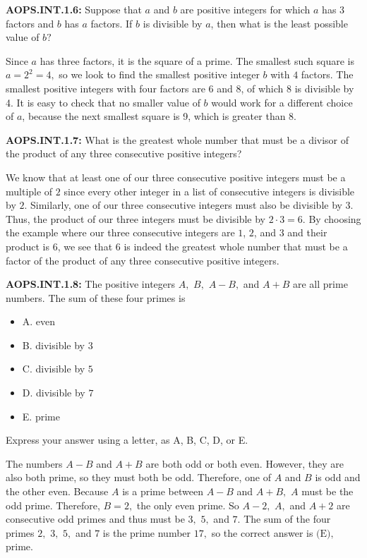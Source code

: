 \documentclass[11pt]{article}
\newenvironment{uzdevums}[1][\unskip]{%
\vspace{3mm}
\noindent
\textbf{#1:}
\noindent}
{}
\begin{document}
\begin{uzdevums}[AOPS.INT.1.6]
Suppose that $a$ and $b$ are positive integers for which $a$ has $3$ factors and $b$ has $a$ factors. If $b$ is divisible by $a$, then what is the least possible value of $b?$
\end{uzdevums}

Since $a$ has three factors, it is the square of a prime. The smallest such square is $a=2^2=4,$ so we look to find the smallest positive integer $b$ with $4$ factors. The smallest positive integers with four factors are 6 and 8, of which $\boxed{8}$ is divisible by 4. It is easy to check that no smaller value of $b$ would work for a different choice of $a$, because the next smallest square is 9, which is greater than 8.


\begin{uzdevums}[AOPS.INT.1.7]
What is the greatest whole number that must be a divisor of the product of any three consecutive positive integers?
\end{uzdevums}

We know that at least one of our three consecutive positive integers must be a multiple of $2$ since every other integer in a list of consecutive integers is divisible by $2$. Similarly, one of our three consecutive integers must also be divisible by $3$. Thus, the product of our three integers must be divisible by $2 \cdot 3 = 6$. By choosing the example where our three consecutive integers are $1$, $2$, and $3$ and their product is $6$, we see that $\boxed{6}$ is indeed the greatest whole number that must be a factor of the product of any three consecutive positive integers.

\begin{uzdevums}[AOPS.INT.1.8]
The positive integers $A,$ $B,$ $A-B,$ and $A+B$ are all prime numbers. The sum of these four primes is
\begin{itemize}
\item A. even
\item B. divisible by $3$
\item C. divisible by $5$
\item D. divisible by $7$
\item E. prime
\end{itemize}
Express your answer using a letter, as A, B, C, D, or E.
\end{uzdevums}

The numbers $A-B$ and $A+B$ are both odd or both even. However, they are also both prime, so they must both be odd. Therefore, one of $A$ and $B$ is odd and the other even. Because $A$ is a prime between $A-B$ and $A+B,$ $A$ must be the odd prime. Therefore, $B=2,$ the only even prime. So $A-2,$ $A,$ and $A+2$ are consecutive odd primes and thus must be $3,$ $5,$ and $7.$ The sum of the four primes $2,$ $3,$ $5,$ and $7$ is the prime number $17,$ so the correct answer is $\boxed{\text{(E)},}$ prime.
\end{document}
